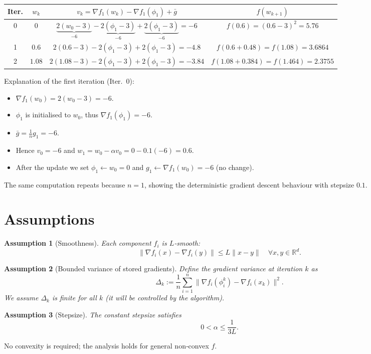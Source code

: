 \documentclass{article}
\newtheorem{assumption}{Assumption}
\newcommand{\R}{\mathbb{R}}
\begin{document}
\begin{center}
\begin{tabular}{c|c|c|c}
\textbf{Iter.} & $w_k$ & $v_k=\nabla f_1(w_k)-\nabla f_1(\phi_1)+\bar g$ & $f(w_{k+1})$\\ \hline
0 & $0$ &
$\displaystyle \underbrace{2(w_0-3)}_{-6}
-\underbrace{2(\phi_1-3)}_{-6}
+\underbrace{2(\phi_1-3)}_{-6}
=-6$ & $f(0.6)= (0.6-3)^2=5.76$\\[4pt]
1 & $0.6$ &
$\displaystyle 2(0.6-3)-2(\phi_1-3)+2(\phi_1-3) = -4.8$ & $f(0.6+0.48)=f(1.08)=3.6864$\\[4pt]
2 & $1.08$ &
$\displaystyle 2(1.08-3)-2(\phi_1-3)+2(\phi_1-3) = -3.84$ & $f(1.08+0.384)=f(1.464)=2.3755$\\
\end{tabular}
\end{center}
Explanation of the first iteration (Iter.~0):
\begin{itemize}
\item $\nabla f_1(w_0)=2(w_0-3)=-6$.
\item $\phi_1$ is initialised to $w_0$, thus $\nabla f_1(\phi_1)=-6$.
\item $\bar g=\frac1n g_1 =-6$.
\item Hence $v_0=-6$ and $w_1=w_0-\alpha v_0 =0-0.1(-6)=0.6$.
\item After the update we set $\phi_1\gets w_0=0$ and $g_1\gets\nabla f_1(w_0)=-6$ (no change).
\end{itemize}
The same computation repeats because $n=1$, showing the deterministic gradient descent behaviour with stepsize $0.1$.


\section*{Assumptions}
\begin{assumption}[Smoothness]\label{as:smooth}
Each component $f_i$ is $L$‑smooth:
\[
\|\nabla f_i(x)-\nabla f_i(y)\|\le L\|x-y\|\quad\forall x,y\in\R^{d}.
\]
\end{assumption}
\begin{assumption}[Bounded variance of stored gradients]\label{as:var}
Define the gradient variance at iteration $k$ as
\[
\Delta_k:=\frac{1}{n}\sum_{i=1}^{n}\|\nabla f_i(\phi_i^k)-\nabla f_i(x_k)\|^{2}.
\]
We assume $\Delta_k$ is finite for all $k$ (it will be controlled by the algorithm).
\end{assumption}
\begin{assumption}[Stepsize]\label{as:stepsize}
The constant stepsize satisfies
\[
0<\alpha\le \frac{1}{3L}.
\]
\end{assumption}
No convexity is required; the analysis holds for general non‑convex $f$.
\end{document}
